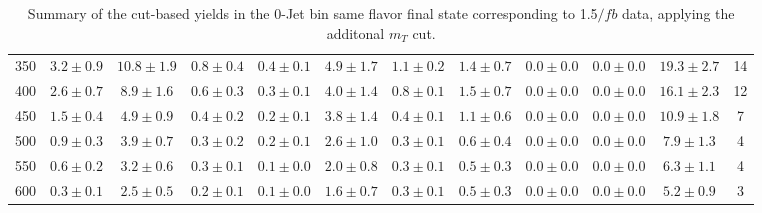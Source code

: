 \begin{table}
{\begin{center}
\begin{tabular}{l c c c c c c c c c c c }
350 & $3.2\pm0.9$ & $10.8\pm1.9$ & $0.8\pm0.4$ & $0.4\pm0.1$ & $4.9\pm1.7$ & $1.1\pm0.2$ & $1.4\pm0.7$ & $0.0\pm0.0$ & $0.0\pm0.0$ & $19.3\pm2.7$ & 14 \\
400 & $2.6\pm0.7$ & $8.9\pm1.6$ & $0.6\pm0.3$ & $0.3\pm0.1$ & $4.0\pm1.4$ & $0.8\pm0.1$ & $1.5\pm0.7$ & $0.0\pm0.0$ & $0.0\pm0.0$ & $16.1\pm2.3$ & 12 \\
450 & $1.5\pm0.4$ & $4.9\pm0.9$ & $0.4\pm0.2$ & $0.2\pm0.1$ & $3.8\pm1.4$ & $0.4\pm0.1$ & $1.1\pm0.6$ & $0.0\pm0.0$ & $0.0\pm0.0$ & $10.9\pm1.8$ & 7 \\
500 & $0.9\pm0.3$ & $3.9\pm0.7$ & $0.3\pm0.2$ & $0.2\pm0.1$ & $2.6\pm1.0$ & $0.3\pm0.1$ & $0.6\pm0.4$ & $0.0\pm0.0$ & $0.0\pm0.0$ & $7.9\pm1.3$ & 4 \\
550 & $0.6\pm0.2$ & $3.2\pm0.6$ & $0.3\pm0.1$ & $0.1\pm0.0$ & $2.0\pm0.8$ & $0.3\pm0.1$ & $0.5\pm0.3$ & $0.0\pm0.0$ & $0.0\pm0.0$ & $6.3\pm1.1$ & 4 \\
600 & $0.3\pm0.1$ & $2.5\pm0.5$ & $0.2\pm0.1$ & $0.1\pm0.0$ & $1.6\pm0.7$ & $0.3\pm0.1$ & $0.5\pm0.3$ & $0.0\pm0.0$ & $0.0\pm0.0$ & $5.2\pm0.9$ & 3 \\
\hline
\end{tabular}
\end{center}
}
\caption{Summary of the cut-based yields in the 0-Jet bin same flavor final state corresponding to 1.5$/fb$ data, applying the additonal $m_T$ cut.}
\end{table}
